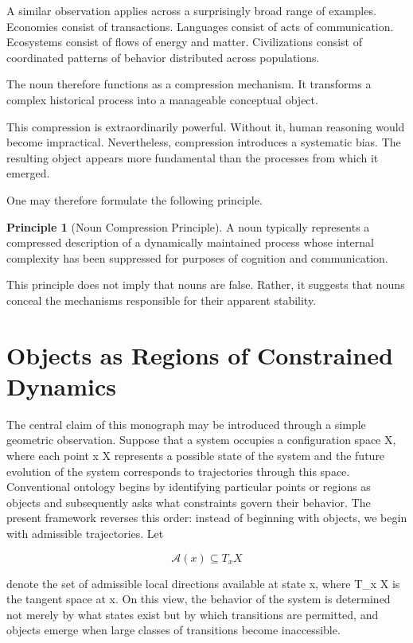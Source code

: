 \documentclass[11pt,oneside]{book}
\theoremstyle{plain}
\theoremstyle{definition}
\newtheorem{principle}[theorem]{Principle}
\theoremstyle{remark}
\begin{document}
A similar observation applies across a surprisingly broad range of examples. Economies consist of transactions. Languages consist of acts of communication. Ecosystems consist of flows of energy and matter. Civilizations consist of coordinated patterns of behavior distributed across populations.

The noun therefore functions as a compression mechanism. It transforms a complex historical process into a manageable conceptual object.

This compression is extraordinarily powerful. Without it, human reasoning would become impractical. Nevertheless, compression introduces a systematic bias. The resulting object appears more fundamental than the processes from which it emerged.

One may therefore formulate the following principle.

\begin{principle}[Noun Compression Principle]
A noun typically represents a compressed description of a dynamically maintained process whose internal complexity has been suppressed for purposes of cognition and communication.
\end{principle}

This principle does not imply that nouns are false. Rather, it suggests that nouns conceal the mechanisms responsible for their apparent stability.

\section{Objects as Regions of Constrained Dynamics}

The central claim of this monograph may be introduced through a simple geometric observation. Suppose that a system occupies a configuration space X, where each point x \in X represents a possible state of the system and the future evolution of the system corresponds to trajectories through this space. Conventional ontology begins by identifying particular points or regions as objects and subsequently asks what constraints govern their behavior. The present framework reverses this order: instead of beginning with objects, we begin with admissible trajectories. Let

\begin{equation}
\mathcal{A}(x)
\subseteq T_x X
\end{equation}

denote the set of admissible local directions available at state x, where T_x X is the tangent space at x. On this view, the behavior of the system is determined not merely by what states exist but by which transitions are permitted, and objects emerge when large classes of transitions become inaccessible.
\end{document}
